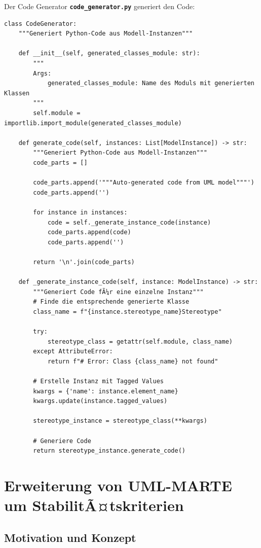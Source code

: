 ﻿\documentclass[a4paper,12pt]{report}
\theoremstyle{definition}
\begin{document}
Der Code Generator \texttt{\textbf{code\_generator.py}} generiert den Code:
\begin{lstlisting}[style=python, caption={ProfileParser Implementierung}, label={lst:profile-parser2}]
class CodeGenerator:
    """Generiert Python-Code aus Modell-Instanzen"""
    
    def __init__(self, generated_classes_module: str):
        """
        Args:
            generated_classes_module: Name des Moduls mit generierten Klassen
        """
        self.module = importlib.import_module(generated_classes_module)
    
    def generate_code(self, instances: List[ModelInstance]) -> str:
        """Generiert Python-Code aus Modell-Instanzen"""
        code_parts = []
        
        code_parts.append('"""Auto-generated code from UML model"""')
        code_parts.append('')
        
        for instance in instances:
            code = self._generate_instance_code(instance)
            code_parts.append(code)
            code_parts.append('')
        
        return '\n'.join(code_parts)
    
    def _generate_instance_code(self, instance: ModelInstance) -> str:
        """Generiert Code fÃ¼r eine einzelne Instanz"""
        # Finde die entsprechende generierte Klasse
        class_name = f"{instance.stereotype_name}Stereotype"
        
        try:
            stereotype_class = getattr(self.module, class_name)
        except AttributeError:
            return f"# Error: Class {class_name} not found"
        
        # Erstelle Instanz mit Tagged Values
        kwargs = {'name': instance.element_name}
        kwargs.update(instance.tagged_values)
        
        stereotype_instance = stereotype_class(**kwargs)
        
        # Generiere Code
        return stereotype_instance.generate_code()
\end{lstlisting}

\section{Erweiterung von UML-MARTE um StabilitÃ¤tskriterien}
\label{sec:marte-stability}

\subsection{Motivation und Konzept}
\end{document}
